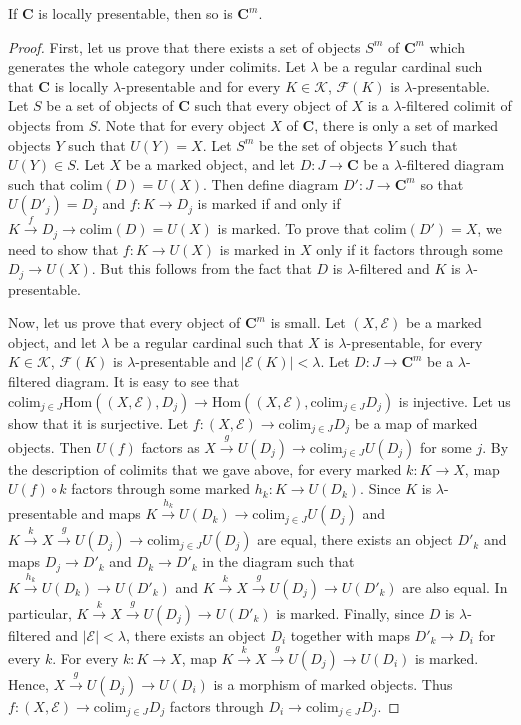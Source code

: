 \documentclass[reqno]{amsart}
\theoremstyle{definition}
\theoremstyle{remark}
\newcommand{\cat}[1]{\mathbf{#1}}
\newcommand{\C}{\cat{C}}
\newcommand{\Hom}{\mathrm{Hom}}
\newcommand{\colim}{\mathrm{colim}}
\numberwithin{figure}{section}
\begin{document}
\begin{prop}
If $\C$ is locally presentable, then so is $\C^m$.
\end{prop}
\begin{proof}
First, let us prove that there exists a set of objects $S^m$ of $\C^m$ which generates the whole category under colimits.
Let $\lambda$ be a regular cardinal such that $\C$ is locally $\lambda$-presentable and for every $K \in \mathcal{K}$, $\mathcal{F}(K)$ is $\lambda$-presentable.
Let $S$ be a set of objects of $\C$ such that every object of $X$ is a $\lambda$-filtered colimit of objects from $S$.
Note that for every object $X$ of $\C$, there is only a set of marked objects $Y$ such that $U(Y) = X$.
Let $S^m$ be the set of objects $Y$ such that $U(Y) \in S$.
Let $X$ be a marked object, and let $D : J \to \C$ be a $\lambda$-filtered diagram such that $\colim(D) = U(X)$.
Then define diagram $D' : J \to \C^m$ so that $U(D'_j) = D_j$ and $f : K \to D_j$ is marked if and only if $K \xrightarrow{f} D_j \to \colim(D) = U(X)$ is marked.
To prove that $\colim(D') = X$, we need to show that $f : K \to U(X)$ is marked in $X$ only if it factors through some $D_j \to U(X)$.
But this follows from the fact that $D$ is $\lambda$-filtered and $K$ is $\lambda$-presentable.

Now, let us prove that every object of $\C^m$ is small.
Let $(X,\mathcal{E})$ be a marked object, and let $\lambda$ be a regular cardinal such that
$X$ is $\lambda$-presentable, for every $K \in \mathcal{K}$, $\mathcal{F}(K)$ is $\lambda$-presentable and $|\mathcal{E}(K)| < \lambda$.
Let $D : J \to \C^m$ be a $\lambda$-filtered diagram.
It is easy to see that $\colim_{j \in J} \Hom((X,\mathcal{E}), D_j) \to \Hom((X,\mathcal{E}), \colim_{j \in J} D_j)$ is injective.
Let us show that it is surjective.
Let $f : (X,\mathcal{E}) \to \colim_{j \in J} D_j$ be a map of marked objects.
Then $U(f)$ factors as $X \xrightarrow{g} U(D_j) \to \colim_{j \in J} U(D_j)$ for some $j$.
By the description of colimits that we gave above, for every marked $k : K \to X$, map $U(f) \circ k$ factors through some marked $h_k : K \to U(D_k)$.
Since $K$ is $\lambda$-presentable and maps $K \xrightarrow{h_k} U(D_k) \to \colim_{j \in J} U(D_j)$
and $K \xrightarrow{k} X \xrightarrow{g} U(D_j) \to \colim_{j \in J} U(D_j)$ are equal,
there exists an object $D'_k$ and maps $D_j \to D'_k$ and $D_k \to D'_k$ in the diagram such that
$K \xrightarrow{h_k} U(D_k) \to U(D'_k)$ and $K \xrightarrow{k} X \xrightarrow{g} U(D_j) \to U(D'_k)$ are also equal.
In particular, $K \xrightarrow{k} X \xrightarrow{g} U(D_j) \to U(D'_k)$ is marked.
Finally, since $D$ is $\lambda$-filtered and $|\mathcal{E}| < \lambda$, there exists an object $D_i$ together with maps $D'_k \to D_i$ for every $k$.
For every $k : K \to X$, map $K \xrightarrow{k} X \xrightarrow{g} U(D_j) \to U(D_i)$ is marked.
Hence, $X \xrightarrow{g} U(D_j) \to U(D_i)$ is a morphism of marked objects.
Thus $f : (X,\mathcal{E}) \to \colim_{j \in J} D_j$ factors through $D_i \to \colim_{j \in J} D_j$.
\end{proof}
\end{document}
